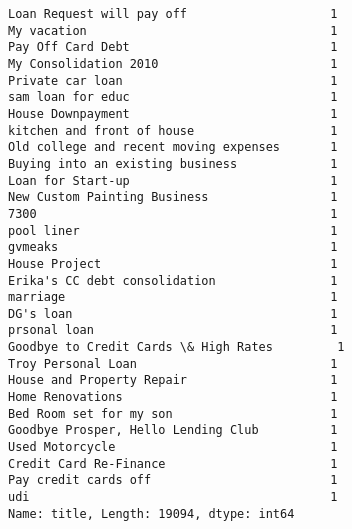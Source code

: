 \documentclass[11pt]{article}
\begin{document}
\begin{Verbatim}[commandchars=\\\{\}]
Loan Request will pay off                    1
My vacation                                  1
Pay Off Card Debt                            1
My Consolidation 2010                        1
Private car loan                             1
sam loan for educ                            1
House Downpayment                            1
kitchen and front of house                   1
Old college and recent moving expenses       1
Buying into an existing business             1
Loan for Start-up                            1
New Custom Painting Business                 1
7300                                         1
pool liner                                   1
gvmeaks                                      1
House Project                                1
Erika's CC debt consolidation                1
marriage                                     1
DG's loan                                    1
prsonal loan                                 1
Goodbye to Credit Cards \& High Rates         1
Troy Personal Loan                           1
House and Property Repair                    1
Home Renovations                             1
Bed Room set for my son                      1
Goodbye Prosper, Hello Lending Club          1
Used Motorcycle                              1
Credit Card Re-Finance                       1
Pay credit cards off                         1
udi                                          1
Name: title, Length: 19094, dtype: int64

    \end{Verbatim}
\end{document}
